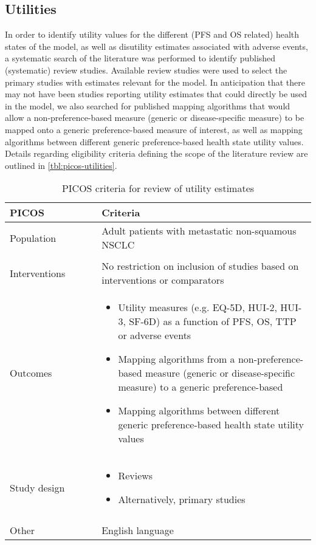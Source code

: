 \documentclass[11pt,final,fleqn]{article}\usepackage[]{graphicx}\usepackage[]{color}
\theoremstyle{plain}
\begin{document}
\begin{appendices}
\FloatBarrier



\subsection{Utilities}
In order to identify utility values for the different (PFS and OS related) health states of the model, as well as disutility estimates associated with adverse events, a systematic search of the literature was performed to identify published (systematic) review studies. Available review studies were used to select the primary studies with estimates relevant for the model. In anticipation that there may not have been studies reporting utility estimates that could directly be used in the model, we also searched for published mapping algorithms that would allow a non-preference-based measure (generic or disease-specific measure) to be mapped onto a generic preference-based measure of interest, as well as mapping algorithms between different generic preference-based health state utility values. Details regarding eligibility criteria defining the scope of the literature review are outlined in \autoref{tbl:picos-utilities}. 


\begin{table}[!ht]
\begin{center}
\begin{threeparttable}
\caption{PICOS criteria for review of utility estimates} \label{tbl:picos-utilities}
\begin{tabular}{p{0.3\linewidth}p{0.7\linewidth}}
\hline
\multicolumn{1}{l}{PICOS} &  \multicolumn{1}{l}{Criteria}\\
\hline
Population & Adult patients with metastatic non-squamous NSCLC\\
&\\
Interventions & No restriction on inclusion of studies based on interventions or comparators\\
Outcomes & 
\begin{itemize}
\item Utility measures (e.g. EQ-5D, HUI-2, HUI-3, SF-6D) as a function of PFS, OS, TTP or adverse events
\item Mapping algorithms from a non-preference-based measure (generic or disease-specific measure) to a generic preference-based
\item Mapping algorithms between different generic preference-based health state utility values
\end{itemize} \\
Study design & 
\begin{itemize}
\item Reviews
\item Alternatively, primary studies
\end{itemize} \\
&\\
Other & 
English language\\
\hline
\end{tabular}
\end{threeparttable}
\end{center}
\end{table}



\end{appendices}
\end{document}
